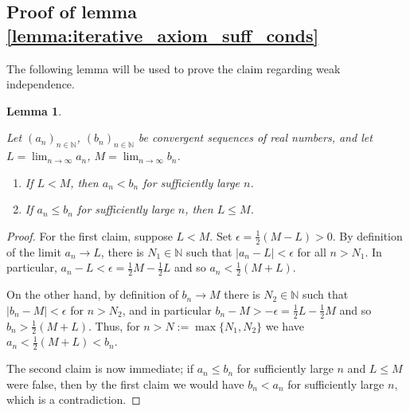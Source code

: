 \documentclass{article}
\theoremstyle{definition} \newtheorem{definition}{Definition}
\theoremstyle{definition} \newtheorem{example}{Example}
\theoremstyle{plain} \newtheorem{axiom}{Axiom}
\theoremstyle{plain} \newtheorem*{remark}{Remark}
\theoremstyle{remark} \newtheorem*{notation}{Notation}
\theoremstyle{plain} \newtheorem{lemma}{Lemma}
\theoremstyle{plain} \newtheorem{theorem}{Theorem}
\theoremstyle{plain} \newtheorem{proposition}{Proposition}
\newcommand{\Nat}{\mathbb{N}}
\begin{document}
\subsection{Proof of lemma \ref{lemma:iterative_axiom_suff_conds}}

The following lemma will be used to prove the claim regarding weak
independence.

\begin{lemma}
\label{lemma:sequence_lemma}

Let $(a_n)_{n \in \Nat}$, $(b_n)_{n \in \Nat}$ be convergent sequences of real
numbers, and let $L = \lim_{n \rightarrow \infty}a_n$, $M = \lim_{n \rightarrow
\infty}b_n$.
\begin{enumerate}
    \item If $L < M$, then $a_n < b_n$ for sufficiently large $n$.
    \item If $a_n \le b_n$ for sufficiently large $n$, then $L \le M$.
\end{enumerate}
\end{lemma}

\begin{proof}

For the first claim, suppose $L < M$. Set $\epsilon = \frac{1}{2}(M - L) > 0$.
By definition of the limit $a_n \rightarrow L$, there is $N_1 \in \Nat$ such
that $|a_n - L| < \epsilon$ for all $n > N_1$. In particular, $a_n - L <
\epsilon = \frac{1}{2}M - \frac{1}{2}L$ and so $a_n < \frac{1}{2}(M + L)$.

On the other hand, by definition of $b_n \rightarrow M$ there is $N_2 \in \Nat$
such that $|b_n - M| < \epsilon$ for $n > N_2$, and in particular $b_n - M >
-\epsilon = \frac{1}{2}L - \frac{1}{2}M$ and so $b_n > \frac{1}{2}(M + L)$.
Thus, for $n > N:=\max\{N_1, N_2\}$ we have $a_n < \frac{1}{2}(M + L) < b_n$.

The second claim is now immediate; if $a_n \le b_n$ for sufficiently large $n$
and $L \le M$ were false, then by the first claim we would have $b_n < a_n$ for
sufficiently large $n$, which is a contradiction.

\end{proof}
\end{document}
